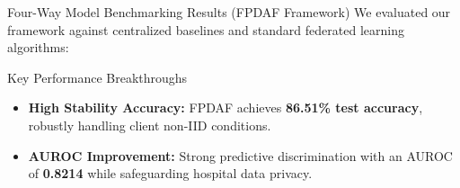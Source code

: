 \documentclass[aspectratio=169, 11pt]{beamer}
\begin{document}
\begin{frame}{Four-Way Model Benchmarking Results (FPDAF Framework)}
    \scriptsize
    We evaluated our framework against centralized baselines and standard federated learning algorithms:
    \vspace{0.2cm}
    \begin{table}
        \centering
        \renewcommand{\arraystretch}{1.1}
    \end{table}
    \vspace{0.1cm}
    \begin{block}{Key Performance Breakthroughs}
        \begin{itemize}
            \item \textbf{High Stability Accuracy:} FPDAF achieves \textbf{86.51\% test accuracy}, robustly handling client non-IID conditions.
            \item \textbf{AUROC Improvement:} Strong predictive discrimination with an AUROC of \textbf{0.8214} while safeguarding hospital data privacy.
        \end{itemize}
    \end{block}
\end{frame}
\end{document}
